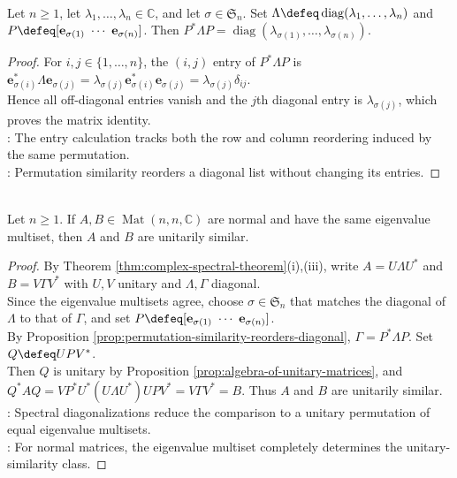 \begin{proposition} \label{prop:permutation-similarity-reorders-diagonal} \\
Let $n\geq1$, let $\lambda_1,\ldots,\lambda_n\in\mathbb{C}$, and let $\sigma\in\mathfrak{S}_n$. Set $\Lambda\defeq\operatorname{diag}(\lambda_1,\ldots,\lambda_n)$ and $P\defeq[\mathbf{e}_{\sigma(1)}\ \cdots\ \mathbf{e}_{\sigma(n)}]$. Then $P^*\Lambda P=\operatorname{diag}(\lambda_{\sigma(1)},\ldots,\lambda_{\sigma(n)})$.
\begin{proof}
For $i,j\in\{1,\ldots,n\}$, the $(i,j)$ entry of $P^*\Lambda P$ is $\mathbf{e}_{\sigma(i)}^*\Lambda\mathbf{e}_{\sigma(j)}=\lambda_{\sigma(j)}\mathbf{e}_{\sigma(i)}^*\mathbf{e}_{\sigma(j)}=\lambda_{\sigma(j)}\delta_{ij}$.\\
Hence all off-diagonal entries vanish and the $j$th diagonal entry is $\lambda_{\sigma(j)}$, which proves the matrix identity.\\
: The entry calculation tracks both the row and column reordering induced by the same permutation.\\
: Permutation similarity reorders a diagonal list without changing its entries.
\end{proof}
\end{proposition}

\begin{corollary} \label{cor:normal-matrices-same-spectrum-unitarily-similar} \\
Let $n\geq1$. If $A,B\in\operatorname{Mat}(n,n,\mathbb{C})$ are normal and have the same eigenvalue multiset, then $A$ and $B$ are unitarily similar.
\begin{proof}
By Theorem \ref{thm:complex-spectral-theorem}(i),(iii), write $A=U\Lambda U^*$ and $B=V\Gamma V^*$ with $U,V$ unitary and $\Lambda,\Gamma$ diagonal.\\
Since the eigenvalue multisets agree, choose $\sigma\in\mathfrak{S}_n$ that matches the diagonal of $\Lambda$ to that of $\Gamma$, and set $P\defeq[\mathbf{e}_{\sigma(1)}\ \cdots\ \mathbf{e}_{\sigma(n)}]$.\\
By Proposition \ref{prop:permutation-similarity-reorders-diagonal}, $\Gamma=P^*\Lambda P$. Set $Q\defeq UPV^*$.\\
Then $Q$ is unitary by Proposition \ref{prop:algebra-of-unitary-matrices}, and $Q^*AQ=VP^*U^*(U\Lambda U^*)UPV^*=V\Gamma V^*=B$. Thus $A$ and $B$ are unitarily similar.\\
: Spectral diagonalizations reduce the comparison to a unitary permutation of equal eigenvalue multisets.\\
: For normal matrices, the eigenvalue multiset completely determines the unitary-similarity class.
\end{proof}
\end{corollary}

